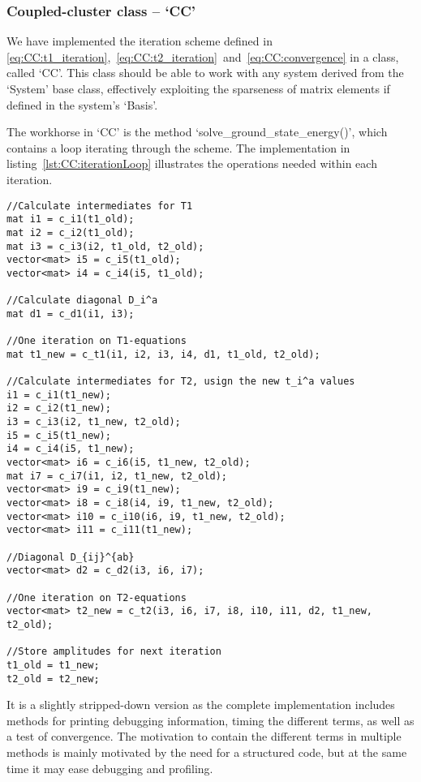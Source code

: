 \subsubsection{Coupled-cluster class -- `CC'}
We have implemented the iteration scheme defined in \eqref{eq:CC:t1_iteration},~\eqref{eq:CC:t2_iteration}~and~\eqref{eq:CC:convergence} in a class, called `CC'.
This class should be able to work with any system derived from the `System' base class, effectively exploiting the sparseness of matrix elements if defined in the system's `Basis'.

The workhorse in `CC' is the method `solve\_ground\_state\_energy()', which contains a loop iterating through the scheme.
The implementation in listing~\ref{lst:CC:iterationLoop} illustrates the operations needed within each iteration.
\begin{lstlisting}[float,label=lst:CC:iterationLoop,caption=The main content of the iteration loop in CC::solve\_ground\_state\_energy().]
//Calculate intermediates for T1
mat i1 = c_i1(t1_old);
mat i2 = c_i2(t1_old);
mat i3 = c_i3(i2, t1_old, t2_old);
vector<mat> i5 = c_i5(t1_old);
vector<mat> i4 = c_i4(i5, t1_old);

//Calculate diagonal D_i^a
mat d1 = c_d1(i1, i3);

//One iteration on T1-equations
mat t1_new = c_t1(i1, i2, i3, i4, d1, t1_old, t2_old);

//Calculate intermediates for T2, usign the new t_i^a values
i1 = c_i1(t1_new);
i2 = c_i2(t1_new);
i3 = c_i3(i2, t1_new, t2_old);
i5 = c_i5(t1_new);
i4 = c_i4(i5, t1_new);
vector<mat> i6 = c_i6(i5, t1_new, t2_old);
mat i7 = c_i7(i1, i2, t1_new, t2_old);
vector<mat> i9 = c_i9(t1_new);
vector<mat> i8 = c_i8(i4, i9, t1_new, t2_old);
vector<mat> i10 = c_i10(i6, i9, t1_new, t2_old);
vector<mat> i11 = c_i11(t1_new);

//Diagonal D_{ij}^{ab}
vector<mat> d2 = c_d2(i3, i6, i7);

//One iteration on T2-equations
vector<mat> t2_new = c_t2(i3, i6, i7, i8, i10, i11, d2, t1_new, t2_old);

//Store amplitudes for next iteration
t1_old = t1_new;
t2_old = t2_new;
\end{lstlisting}
It is a slightly stripped-down version as the complete implementation includes methods for printing debugging information, timing the different terms, as well as a test of convergence.
The motivation to contain the different terms in multiple methods is mainly motivated by the need for a structured code, but at the same time it may ease debugging and profiling.
